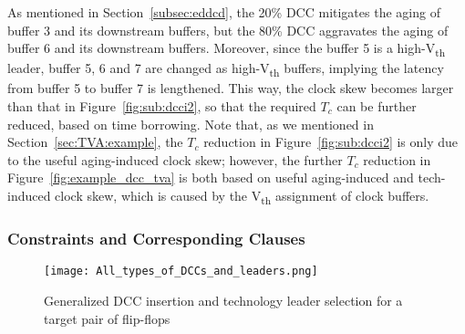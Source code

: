 As mentioned in Section~\ref{subsec:eddcd}, the 20\% DCC mitigates the aging of buffer 3 and its downstream buffers, but the 80\% DCC aggravates the aging of buffer 6 and its downstream buffers. Moreover, since the buffer 5 is a high-V\textsubscript{th} leader, buffer 5, 6 and 7 are changed as high-V\textsubscript{th} buffers, implying the latency from buffer 5 to buffer 7 is lengthened. This way, the clock skew becomes larger than that in Figure~\ref{fig:sub:dcci2}, so that the required $T_c$ can be further reduced, based on time borrowing. Note that, as we mentioned in Section~\ref{sec:TVA:example}, the $T_c$ reduction in Figure~\ref{fig:sub:dcci2} is only due to the useful aging-induced clock skew; however, the  further $T_c$ reduction in Figure~\ref{fig:example_dcc_tva} is both based on useful aging-induced and tech-induced clock skew, which is caused by the V\textsubscript{th} assignment of clock buffers. 

\subsubsection{Constraints and Corresponding Clauses}
\label{sec:TVA:leaderconstraint}
\begin{figure}
    \centering
    \texttt{[image: All\_types\_of\_DCCs\_and\_leaders.png]}
    \caption{Generalized DCC insertion and technology leader selection for a target pair of flip-flops}
    \label{fig:g_dcc_leader}
\end{figure}

